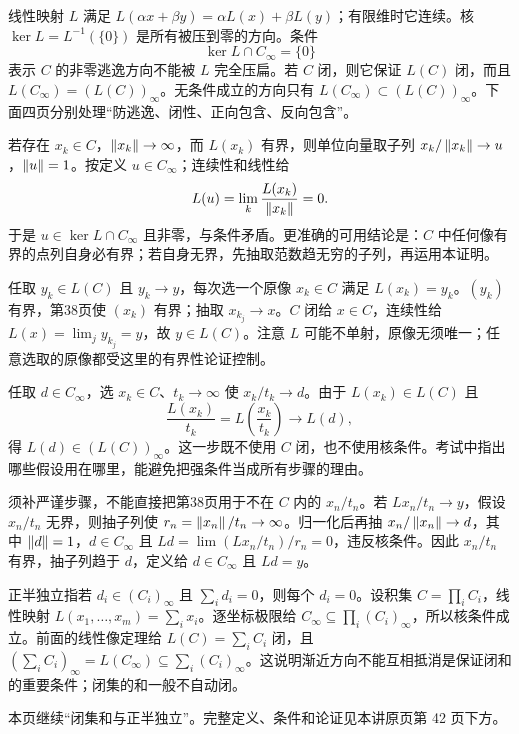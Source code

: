 线性映射 $L$ 满足 $L(\alpha x+\beta y)=\alpha L(x)+\beta L(y)$；有限维时它连续。核 $\ker L=L^{-1}(\{0\})$ 是所有被压到零的方向。条件
\[\ker L\cap C_\infty=\{0\}\]
表示 $C$ 的非零逃逸方向不能被 $L$ 完全压扁。若 $C$ 闭，则它保证 $L(C)$ 闭，而且 $L(C_\infty)=(L(C))_\infty$。无条件成立的方向只有 $L(C_\infty)\subset(L(C))_\infty$。下面四页分别处理“防逃逸、闭性、正向包含、反向包含”。

若存在 $x_k\in C$，$\left\lVert x_k\right\rVert\to\infty$，而 $L(x_k)$ 有界，则单位向量取子列 $x_k/\left\lVert x_k\right\rVert\to u$，$\left\lVert u\right\rVert=1$。按定义 $u\in C_\infty$；连续性和线性给
\[L(u)=\lim_k \frac{L(x_k)}{\left\lVert x_k\right\rVert}=0.\]
于是 $u\in\ker L\cap C_\infty$ 且非零，与条件矛盾。更准确的可用结论是：$C$ 中任何像有界的点列自身必有界；若自身无界，先抽取范数趋无穷的子列，再运用本证明。

任取 $y_k\in L(C)$ 且 $y_k\to y$，每次选一个原像 $x_k\in C$ 满足 $L(x_k)=y_k$。$(y_k)$ 有界，第38页使 $(x_k)$ 有界；抽取 $x_{k_j}\to x$。$C$ 闭给 $x\in C$，连续性给 $L(x)=\lim_j y_{k_j}=y$，故 $y\in L(C)$。注意 $L$ 可能不单射，原像无须唯一；任意选取的原像都受这里的有界性论证控制。

任取 $d\in C_\infty$，选 $x_k\in C$、$t_k\to\infty$ 使 $x_k/t_k\to d$。由于 $L(x_k)\in L(C)$ 且
\[\frac{L(x_k)}{t_k}=L\!\left(\frac{x_k}{t_k}\right)\longrightarrow L(d),\]
得 $L(d)\in(L(C))_\infty$。这一步既不使用 $C$ 闭，也不使用核条件。考试中指出哪些假设用在哪里，能避免把强条件当成所有步骤的理由。

须补严谨步骤，不能直接把第38页用于不在 $C$ 内的 $x_n/t_n$。若 $Lx_n/t_n\to y$，假设 $x_n/t_n$ 无界，则抽子列使 $r_n=\left\lVert x_n\right\rVert/t_n\to\infty$。归一化后再抽 $x_n/\left\lVert x_n\right\rVert\to d$，其中 $\left\lVert d\right\rVert=1$，$d\in C_\infty$ 且 $Ld=\lim (Lx_n/t_n)/r_n=0$，违反核条件。因此 $x_n/t_n$ 有界，抽子列趋于 $d$，定义给 $d\in C_\infty$ 且 $Ld=y$。

正半独立指若 $d_i\in(C_i)_\infty$ 且 $\sum_i d_i=0$，则每个 $d_i=0$。设积集 $C=\prod_iC_i$，线性映射 $L(x_1,\ldots,x_m)=\sum_i x_i$。逐坐标极限给 $C_\infty\subseteq\prod_i(C_i)_\infty$，所以核条件成立。前面的线性像定理给 $L(C)=\sum_iC_i$ 闭，且 $(\sum_i C_i)_\infty=L(C_\infty)\subseteq\sum_i(C_i)_\infty$。这说明渐近方向不能互相抵消是保证闭和的重要条件；闭集的和一般不自动闭。

本页继续“闭集和与正半独立”。完整定义、条件和论证见本讲原页第 42 页下方。

